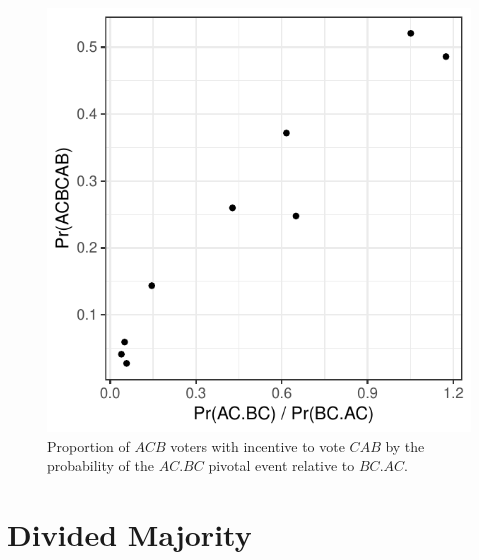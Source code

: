 \documentclass[11pt, letter, margin = 2 in]{article}
\begin{document}
\begin{figure}[!htb]
	\centering
	\includegraphics[width = .45\textwidth]{../output/figures/prediction/sp_c_odd.pdf}
	\caption{Proportion of $ACB$ voters with incentive to vote $CAB$ by the probability of the $AC.BC$ pivotal event relative to $BC.AC$.}
	\label{fig:figure1}
\end{figure}

\section{Divided Majority}
\end{document}
